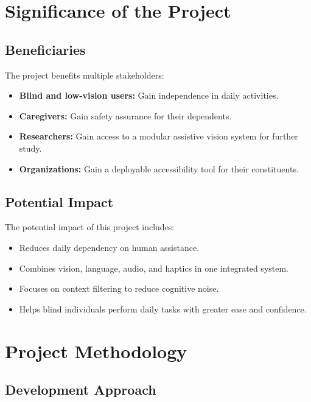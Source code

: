 \documentclass[a4paper]{report}
\begin{document}
\section{Significance of the Project}
\label{sec:significance}

\subsection{Beneficiaries}

The project benefits multiple stakeholders:

\begin{itemize}
    \item \textbf{Blind and low-vision users:} Gain independence in daily activities.
    \item \textbf{Caregivers:} Gain safety assurance for their dependents.
    \item \textbf{Researchers:} Gain access to a modular assistive vision system for further study.
    \item \textbf{Organizations:} Gain a deployable accessibility tool for their constituents.
\end{itemize}

\subsection{Potential Impact}

The potential impact of this project includes:

\begin{itemize}
    \item Reduces daily dependency on human assistance.
    \item Combines vision, language, audio, and haptics in one integrated system.
    \item Focuses on context filtering to reduce cognitive noise.
    \item Helps blind individuals perform daily tasks with greater ease and confidence.
\end{itemize}

\section{Project Methodology}
\label{sec:methodology}

\subsection{Development Approach}
\end{document}
